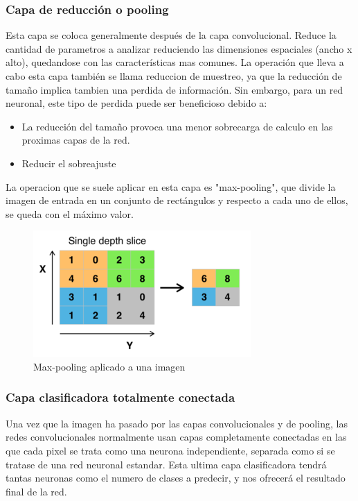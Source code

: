 \subsubsection{Capa de reducción o pooling}
Esta capa se coloca generalmente después de la capa convolucional. Reduce la cantidad de parametros a analizar reduciendo las dimensiones espaciales (ancho x alto), quedandose con las características mas comunes. La operación que lleva a cabo esta capa también se llama reduccion de muestreo, ya que la reducción de tamaño implica tambien una perdida de información. Sin embargo, para un red neuronal, este tipo de perdida puede ser beneficioso debido a:
\begin{itemize}
\item La reducción del tamaño provoca una menor sobrecarga de calculo en las proximas capas de la red.
\item Reducir el sobreajuste
\end{itemize}
La operacion que se suele aplicar en esta capa es "max-pooling", que divide la imagen de entrada en un conjunto de rectángulos y respecto a cada uno de ellos, se queda con el máximo valor.
\begin{figure}[htp]
\centering
\includegraphics[scale=0.7]{images/max_pooling.png}
\caption{Max-pooling aplicado a una imagen}
\end{figure}
\subsubsection{Capa clasificadora totalmente conectada}
Una vez que la imagen ha pasado por las capas convolucionales y de pooling, las redes convolucionales normalmente usan capas completamente conectadas en las que cada pixel se trata como una neurona independiente, separada como si se tratase de una red neuronal estandar. Esta ultima capa clasificadora tendrá tantas neuronas como el numero de clases a predecir, y nos ofrecerá el resultado final de la red.

